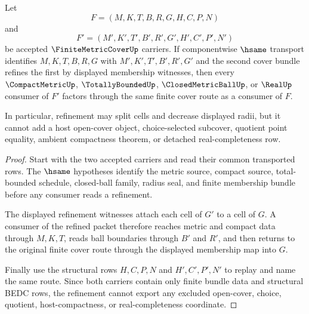 \begin{theorem}
\label{thm:finite-metric-cover-refinement-stability}
Let
$$
F=(M,K,T,B,R,G,H,C,P,N)
$$
and
$$
F'=(M',K',T',B',R',G',H',C',P',N')
$$
be accepted $\FiniteMetricCoverUp$ carriers. If componentwise $\hsame$ transport identifies $M,K,T,B,R,G$ with $M',K',T',B',R',G'$ and the second cover bundle refines the first by displayed membership witnesses, then every $\CompactMetricUp$, $\TotallyBoundedUp$, $\ClosedMetricBallUp$, or $\RealUp$ consumer of $F'$ factors through the same finite cover route as a consumer of $F$.

In particular, refinement may split cells and decrease displayed radii, but it cannot add a host open-cover object, choice-selected subcover, quotient point equality, ambient compactness theorem, or detached real-completeness row.
\end{theorem}
\begin{proof}
Start with the two accepted carriers and read their common transported rows. The $\hsame$ hypotheses identify the metric source, compact source, total-bounded schedule, closed-ball family, radius seal, and finite membership bundle before any consumer reads a refinement.

The displayed refinement witnesses attach each cell of $G'$ to a cell of $G$. A consumer of the refined packet therefore reaches metric and compact data through $M,K,T$, reads ball boundaries through $B'$ and $R'$, and then returns to the original finite cover route through the displayed membership map into $G$.

Finally use the structural rows $H,C,P,N$ and $H',C',P',N'$ to replay and name the same route. Since both carriers contain only finite bundle data and structural BEDC rows, the refinement cannot export any excluded open-cover, choice, quotient, host-compactness, or real-completeness coordinate.
\end{proof}


